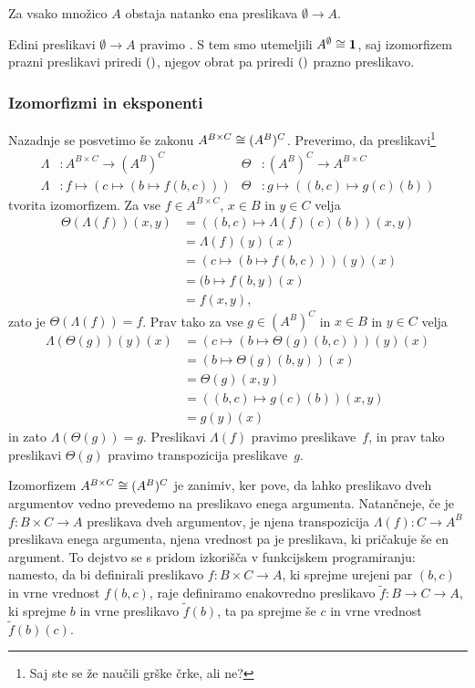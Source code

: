 \begin{trditev}
  Za vsako množico $A$ obstaja natanko ena preslikava $\emptyset \to A$.
\end{trditev}

Edini preslikavi $\emptyset \to A$ pravimo . S tem smo utemeljili
$A^\emptyset \cong \mathtt{\mathbf{1}}$, saj izomorfizem prazni preslikavi priredi
$\mathord{()}$, njegov obrat pa priredi $\mathord{()}$ prazno preslikavo.

\subsubsection{Izomorfizmi in eksponenti}
\label{sec:izomorfizmi-in-eksponenti}

Nazadnje se posvetimo še zakonu $A^{B \times C} \cong (A^B)^C$.
Preverimo, da preslikavi\footnote{Saj ste se že naučili grške črke, ali ne?}
%
\begin{align*}
  \Lambda &: A^{B \times C} \to (A^B)^C
  &
  \Theta &: (A^B)^C \to A^{B \times C}
  \\
  \Lambda &: f \mapsto (c \mapsto (b \mapsto f(b, c)))
  &
  \Theta &: g \mapsto ((b, c) \mapsto g(c)(b))
\end{align*}
%
tvorita izomorfizem. Za vse $f \in A^{B \times C}$, $x \in B$ in $y \in C$ velja
%
\begin{align*}
  \Theta(\Lambda(f))(x, y)
  &= ((b, c) \mapsto \Lambda(f)(c)(b)) (x, y)  \\
  &= \Lambda(f)(y)(x) \\
  &= (c \mapsto (b \mapsto f(b, c)))(y)(x) \\
  &= (b \mapsto f(b, y)(x) \\
  &= f(x, y),
\end{align*}
%
zato je $\Theta(\Lambda(f)) = f$. Prav tako za vse $g \in (A^B)^C$ in $x \in B$ in
$y \in C$ velja
%
\begin{align*}
  \Lambda(\Theta(g))(y)(x)
  &= (c \mapsto (b \mapsto \Theta(g)(b, c)))(y)(x) \\
  &= (b \mapsto \Theta(g)(b, y))(x) \\
  &= \Theta(g)(x, y) \\
  &= ((b, c) \mapsto g(c)(b)) (x, y) \\
  &= g(y)(x)
\end{align*}
%
in zato $\Lambda(\Theta(g)) = g$.
%
Preslikavi $\Lambda(f)$ pravimo  preslikave~$f$, in prav tako preslikavi
$\Theta(g)$ pravimo transpozicija preslikave~$g$.

Izomorfizem $A^{B \times C} \cong (A^B)^C$ je zanimiv, ker pove, da lahko preslikavo dveh
argumentov vedno prevedemo na preslikavo enega argumenta. Natančneje, če je
$f : B \times C \to A$ preslikava dveh argumentov, je njena transpozicija
$\Lambda(f) : C \to A^B$ preslikava enega argumenta, njena vrednost pa je preslikava, ki
pričakuje še en argument. To dejstvo se s pridom izkorišča v funkcijskem programiranju:
namesto, da bi definirali preslikavo $f : B \times C \to A$, ki sprejme urejeni par
$(b, c)$ in vrne vrednost $f(b,c)$, raje definiramo enakovredno preslikavo
$\tilde{f} : B \to C \to A$, ki sprejme $b$ in vrne preslikavo $\tilde{f}(b)$, ta pa
sprejme še $c$ in vrne vrednost $\tilde{f}(b)(c)$.


